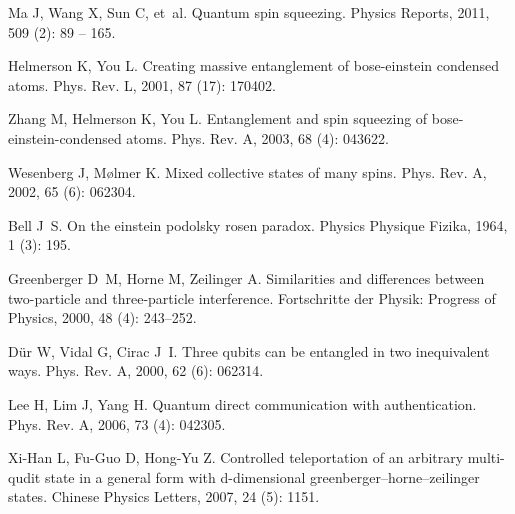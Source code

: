 \begin{thebibliography}{113}
	Ma J, Wang X, Sun C, et~al.
	\newblock Quantum spin squeezing\allowbreak[J].
	\newblock Physics Reports, 2011, 509 (2): 89 -- 165.
	
	Helmerson K, You L.
	\newblock Creating massive entanglement of bose-einstein condensed
	atoms\allowbreak[J].
	\newblock Phys. Rev. L, 2001, 87 (17): 170402.
	
	Zhang M, Helmerson K, You L.
	\newblock Entanglement and spin squeezing of bose-einstein-condensed
	atoms\allowbreak[J].
	\newblock Phys. Rev. A, 2003, 68 (4): 043622.
	
	Wesenberg J, M{\o}lmer K.
	\newblock Mixed collective states of many spins\allowbreak[J].
	\newblock Phys. Rev. A, 2002, 65 (6): 062304.
	
	Bell J~S.
	\newblock On the einstein podolsky rosen paradox\allowbreak[J].
	\newblock Physics Physique Fizika, 1964, 1 (3): 195.
	
	Greenberger D~M, Horne M, Zeilinger A.
	\newblock Similarities and differences between two-particle and three-particle
	interference\allowbreak[J].
	\newblock Fortschritte der Physik: Progress of Physics, 2000, 48 (4):
	243--252.
	
	D{\"u}r W, Vidal G, Cirac J~I.
	\newblock Three qubits can be entangled in two inequivalent ways\allowbreak[J].
	\newblock Phys. Rev. A, 2000, 62 (6): 062314.
	
	Lee H, Lim J, Yang H.
	\newblock Quantum direct communication with authentication\allowbreak[J].
	\newblock Phys. Rev. A, 2006, 73 (4): 042305.
	
	Xi-Han L, Fu-Guo D, Hong-Yu Z.
	\newblock Controlled teleportation of an arbitrary multi-qudit state in a
	general form with d-dimensional greenberger--horne--zeilinger
	states\allowbreak[J].
	\newblock Chinese Physics Letters, 2007, 24 (5): 1151.
	

\end{thebibliography}
